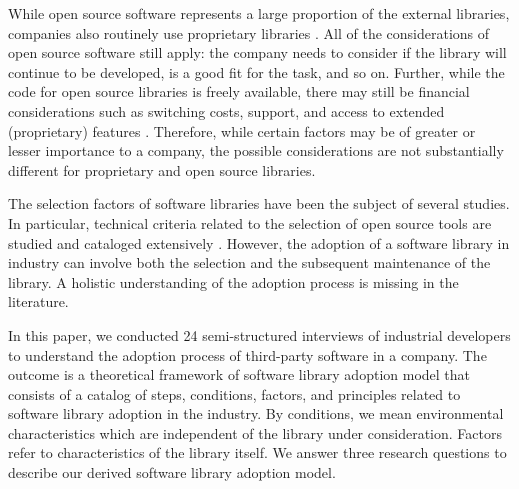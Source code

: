 \documentclass[sigconf,review,anonymous, table]{acmart}
\begin{document}
While open source software represents a large proportion of the external libraries, companies also routinely use proprietary libraries \cite{harutyunyan:2018:understanding}. All of the considerations of open source software still apply: the company needs to consider if the library will continue to be developed, is a good fit for the task, and so on. Further, while the code for open source libraries is freely available, there may still be financial considerations such as switching costs, support, and access to extended (proprietary) features \cite{dahlander2006business}. Therefore, while certain factors may be of greater or lesser importance to a company, the possible considerations are not substantially different for proprietary and open source libraries. 


The selection factors of software libraries have been the subject of several studies. In particular, technical criteria related to the selection of open source tools are studied and cataloged extensively \cite{wasserman2017osspal, li2022exploring, larios2020selecting, huang2018tell, wang2020difftech, wang2021difftech, uddin2017automatic, uddin2017opiner, de2018library, de2018empirical, el2020libcomp, yan2022concept, liu2021api, uddin2019understanding, larios2020selecting}. However, the adoption of a software library in industry can involve both the selection and the subsequent maintenance of the library. 
A holistic understanding of the adoption process is missing in the literature. 

In this paper, we conducted 24 semi-structured interviews of industrial developers to understand the adoption process of third-party software in a company. The outcome is a theoretical framework of software library adoption model that consists of a catalog of steps, conditions, factors, and principles related to software library adoption in the industry. By conditions, we mean environmental characteristics which are independent of the library under consideration. Factors refer to characteristics of the library itself. We answer three research questions to describe our derived software library adoption model. %
\end{document}
